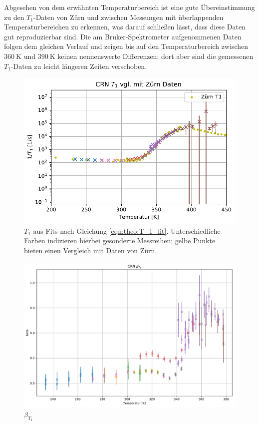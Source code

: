 Abgesehen von dem erwähnten Temperaturbereich ist eine gute Übereinstimmung zu den $T_1$-Daten von Zürn \cite{zuern_paper} und zwischen Messungen mit überlappenden Temperaturbereichen zu erkennen, was darauf schließen lässt, dass diese Daten gut reproduzierbar sind. Die am Bruker-Spektrometer aufgenommenen Daten folgen dem gleichen Verlauf und zeigen bis auf den Temperaturbereich zwischen $\SI{360}{\kelvin}$ und $\SI{390}{\kelvin}$ keinen nennenswerte Differenzen; dort aber sind die gemessenen $T_1$-Daten zu leicht längeren Zeiten verschoben.

\begin{figure}
	\begin{center}
		\includegraphics[width=\textwidth]{graphics/plots/T1/t1.pdf}
	\end{center}
	\caption{$T_1$ aus Fits nach Gleichung \eqref{eqn:theo:T_1_fit}. Unterschiedliche Farben indizieren hierbei gesonderte Messreihen; gelbe Punkte bieten einen Vergleich mit Daten von Zürn.} \label{fig:res:T_1}
\end{figure}

\begin{figure}
	\begin{center}
		\includegraphics[width=\textwidth]{graphics/plots/T1/t1_beta.pdf}
	\end{center}
	\caption{$\beta_{T_1}$} \label{fig:res:beta_T_1}
\end{figure}


